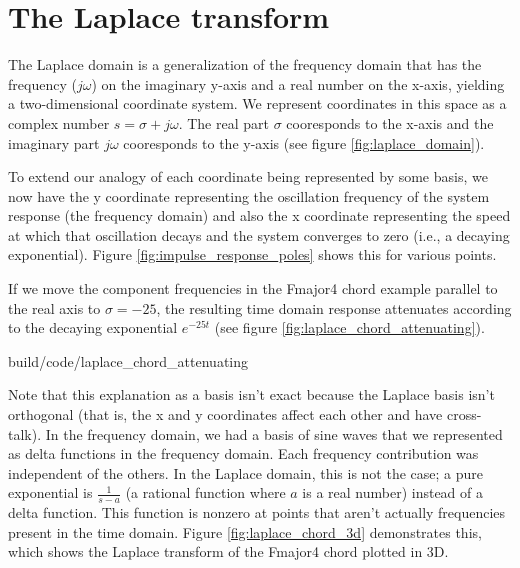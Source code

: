 \section{The Laplace transform}

The Laplace domain is a generalization of the frequency domain that has the
frequency ($j\omega$) on the imaginary y-axis and a real number on the x-axis,
yielding a two-dimensional coordinate system. We represent coordinates in this
space as a complex number $s = \sigma + j\omega$. The real part $\sigma$
cooresponds to the x-axis and the imaginary part $j\omega$ cooresponds to the
y-axis (see figure \ref{fig:laplace_domain}).

\begin{bookfigure}

  \caption{Laplace domain}
  \label{fig:laplace_domain}
\end{bookfigure}

To extend our analogy of each coordinate being represented by some basis, we now
have the y coordinate representing the oscillation frequency of the
\gls{system response} (the frequency domain) and also the x coordinate
representing the speed at which that oscillation decays and the \gls{system}
converges to zero (i.e., a decaying exponential). Figure
\ref{fig:impulse_response_poles} shows this for various points.

If we move the component frequencies in the Fmajor4 chord example parallel to
the real axis to $\sigma = -25$, the resulting time domain response attenuates
according to the decaying exponential $e^{-25t}$ (see figure
\ref{fig:laplace_chord_attenuating}).

\begin{svg}{build/code/laplace_chord_attenuating}
  \caption{Fmajor4 chord at $\sigma = 0$ and $\sigma = -25$}
  \label{fig:laplace_chord_attenuating}
\end{svg}

Note that this explanation as a basis isn't exact because the Laplace basis
isn't orthogonal (that is, the x and y coordinates affect each other and have
cross-talk). In the frequency domain, we had a basis of sine waves that we
represented as delta functions in the frequency domain. Each frequency
contribution was independent of the others. In the Laplace domain, this is not
the case; a pure exponential is $\frac{1}{s - a}$ (a rational function where $a$
is a real number) instead of a delta function. This function is nonzero at
points that aren't actually frequencies present in the time domain. Figure
\ref{fig:laplace_chord_3d} demonstrates this, which shows the Laplace transform
of the Fmajor4 chord plotted in 3D.

